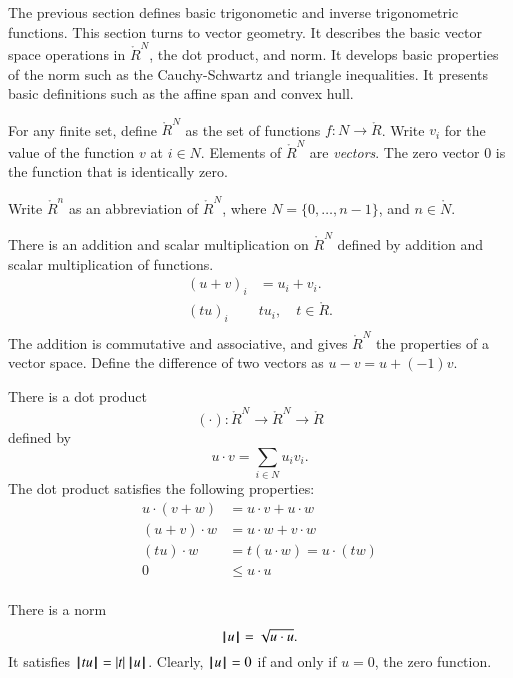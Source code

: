 The previous section defines basic trigonometic and
inverse trigonometric functions.  This section turns
to vector geometry.  It describes the basic vector
space operations in $\ring{R}^N$, the dot product, and
norm.  It develops basic properties of the norm such
as the Cauchy-Schwartz and triangle inequalities.
It presents basic definitions such as the affine span and
convex hull.

\begin{definition}
For any finite set, define $\ring{R}^N$ as the set of functions
$f:N\to\ring{R}$. Write $v_i$ for the value of the function $v$ at $i\in N$.
Elements of $\ring{R}^N$ are {\it vectors}.  The zero vector $0$ is the function that is identically zero.
\end{definition}
Write $\ring{R}^n$ as an abbreviation of $\ring{R}^N$, 
where $N=\{0,\ldots,n-1\}$,  and $n\in\ring{N}$.

There is an addition and scalar multiplication on $\ring{R}^N$
defined by addition and scalar multiplication of functions.
    $$\begin{array}{lll}
    (u + v)_i &= u_i + v_i.\\
    (t u)_i & t u_i,\quad t\in\ring{R}.\\
    \end{array}
    $$
The addition is commutative and associative, and gives
$\ring{R}^N$ the properties of a vector space.
Define the difference of two vectors as $u - v = u + (-1) v$.

There is a dot product
$$(\cdot):\ring{R}^N\to\ring{R}^N\to\ring{R}$$ defined by
    $$u\cdot v = \sum_{i\in N} u_i v_i.$$
The dot product satisfies the following
properties:
    $$\begin{array}{lll}
        u \cdot (v + w) &= u \cdot v + u \cdot w\\
        (u + v)\cdot w &= u \cdot w + v \cdot w\\
        (t u)\cdot w &= t(u \cdot w) = u \cdot (t w)\\
        0 &\le u\cdot u\\
    \end{array}$$


There is a norm
$${{\hskip0.1em|\hskip-0.15em|\hskip0.1em}u{\hskip0.1em|\hskip-0.15em|\hskip0.1em}} = \sqrt{u\cdot u}.$$
It satisfies ${{\hskip0.1em|\hskip-0.15em|\hskip0.1em} t u {\hskip0.1em|\hskip-0.15em|\hskip0.1em}} = |t| \, {{\hskip0.1em|\hskip-0.15em|\hskip0.1em}u{\hskip0.1em|\hskip-0.15em|\hskip0.1em}}$.  Clearly, ${{\hskip0.1em|\hskip-0.15em|\hskip0.1em}u{\hskip0.1em|\hskip-0.15em|\hskip0.1em}}=0$  if and
only if $u=0$, the zero function.


